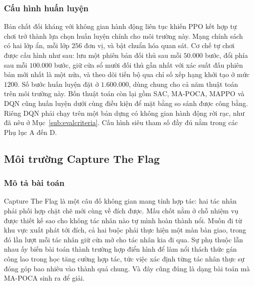 \subsubsection{Cấu hình huấn luyện}
\indent Bản chất đối kháng với không gian hành động liên tục khiến PPO kết hợp tự chơi
trở thành lựa chọn huấn luyện chính cho môi trường này. Mạng chính sách có hai lớp ẩn, mỗi lớp
$256$ đơn vị, và bật chuẩn hóa quan sát. Cơ chế tự chơi được cấu hình
như sau: lưu một phiên bản đối thủ sau mỗi $50.000$ bước, đổi phía sau mỗi $100.000$ bước, giữ
cửa sổ mười đối thủ gần nhất với xác suất đấu phiên bản mới nhất là một
nửa, và theo dõi tiến bộ qua chỉ số xếp hạng khởi tạo ở mức $1200$. Số bước huấn luyện đặt ở
$1.600.000$, dùng chung cho cả năm thuật toán trên môi
trường này. Bốn thuật toán còn lại gồm SAC, MA-POCA, MAPPO và DQN cũng huấn luyện dưới cùng
điều kiện để mặt bằng so sánh được công bằng. Riêng DQN phải chạy trên một bản dựng có không
gian hành động rời rạc, như đã nêu ở
Mục~\ref{sub:evalcriteria}. Cấu hình siêu tham số đầy đủ nằm trong các Phụ lục A đến D.

\subsection{Môi trường Capture The Flag}
\label{sub:env-coop}

\subsubsection{Mô tả bài toán}
\indent Capture The Flag là một câu đố không gian mang tính hợp tác: hai tác nhân phải
phối hợp chặt chẽ mới cùng về đích được. Mấu chốt nằm ở chỗ nhiệm vụ được thiết kế sao cho
không tác nhân nào tự mình hoàn thành nổi. Muốn đi từ khu vực xuất phát tới đích, cả hai
buộc phải thực hiện một màn bàn giao, trong đó lần lượt mỗi tác nhân giữ cửa mở cho tác
nhân kia đi qua. Sự phụ thuộc lẫn nhau ấy biến bài toán thành trường hợp điển hình để làm
nổi thách thức gán công lao trong học tăng cường hợp tác, tức việc xác định từng tác nhân
thực sự đóng góp bao nhiêu vào thành quả chung. Và đây cũng đúng là dạng bài toán mà
MA-POCA sinh ra để giải.


